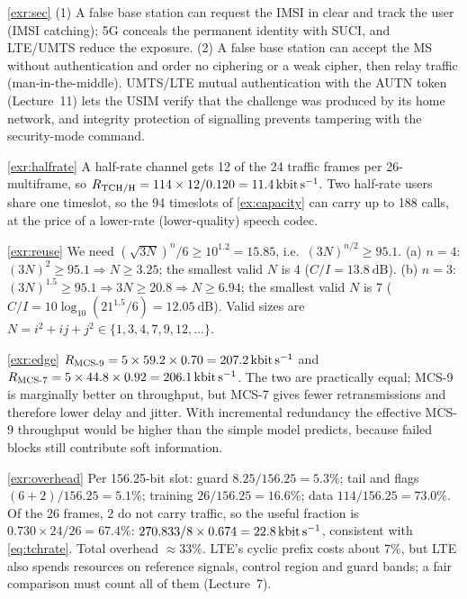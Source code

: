 \documentclass[11pt,a4paper]{article}
\begin{document}
\begin{solutionbox}{\ref{exr:sec}}
(1) A false base station can request the IMSI in clear and track the user (IMSI
catching); 5G conceals the permanent identity with SUCI, and LTE/UMTS reduce the
exposure. (2) A false base station can accept the MS without authentication and
order no ciphering or a weak cipher, then relay traffic (man-in-the-middle). UMTS/LTE
mutual authentication with the AUTN token (Lecture~11) lets the USIM verify that the
challenge was produced by its home network, and integrity protection of signalling
prevents tampering with the security-mode command.
\end{solutionbox}

\begin{solutionbox}{\ref{exr:halfrate}}
A half-rate channel gets 12 of the 24 traffic frames per 26-multiframe, so
$R_{\mathrm{TCH/H}} = 114\times 12/0.120 = \qty{11.4}{\kilo\bit\per\second}$. Two half-rate
users share one timeslot, so the 94 timeslots of \cref{ex:capacity} can carry up to
188 calls, at the price of a lower-rate (lower-quality) speech codec.
\end{solutionbox}

\begin{solutionbox}{\ref{exr:reuse}}
We need $(\sqrt{3N})^n/6 \ge 10^{1.2} = 15.85$, i.e.\ $(3N)^{n/2}\ge 95.1$.
(a) $n=4$: $(3N)^2\ge 95.1 \Rightarrow N\ge 3.25$; the smallest valid $N$ is 4
($C/I=\qty{13.8}{\dB}$). (b) $n=3$: $(3N)^{1.5}\ge95.1 \Rightarrow 3N\ge 20.8 \Rightarrow N\ge 6.94$;
the smallest valid $N$ is 7 ($C/I = 10\log_{10}(21^{1.5}/6) = \qty{12.05}{\dB}$).
Valid sizes are $N = i^2+ij+j^2 \in\{1,3,4,7,9,12,\dots\}$.
\end{solutionbox}

\begin{solutionbox}{\ref{exr:edge}}
$R_{\mathrm{MCS\text{-}9}} = 5\times59.2\times0.70 = \qty{207.2}{\kilo\bit\per\second}$ and
$R_{\mathrm{MCS\text{-}7}} = 5\times44.8\times0.92 = \qty{206.1}{\kilo\bit\per\second}$.
The two are practically equal; MCS-9 is marginally better on throughput, but MCS-7
gives fewer retransmissions and therefore lower delay and jitter. With incremental
redundancy the effective MCS-9 throughput would be higher than the simple model
predicts, because failed blocks still contribute soft information.
\end{solutionbox}

\begin{solutionbox}{\ref{exr:overhead}}
Per 156.25-bit slot: guard $8.25/156.25 = 5.3\%$; tail and flags $(6+2)/156.25 = 5.1\%$;
training $26/156.25 = 16.6\%$; data $114/156.25 = 73.0\%$. Of the 26 frames, 2 do not
carry traffic, so the useful fraction is $0.730\times24/26 = 67.4\%$:
$270.833/8\times0.674 = \qty{22.8}{\kilo\bit\per\second}$, consistent with \cref{eq:tchrate}.
Total overhead $\approx 33\%$. LTE's cyclic prefix costs about $7\%$, but LTE also
spends resources on reference signals, control region and guard bands; a fair
comparison must count all of them (Lecture~7).
\end{solutionbox}
\end{document}
